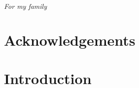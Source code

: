 \documentclass[12pt,]{book}
\theoremstyle{definition}
\theoremstyle{definition}
\theoremstyle{definition}
\theoremstyle{remark}
\renewcommand{\cleardoublepage}{\pagebreak}
\renewcommand{\clearpage}{\pagebreak}
\begin{document}
\pagebreak
\hspace{0pt}
\vfill
\begin{center}
\textit{For my family}
\end{center}
\vfill\hspace{0pt}
\pagebreak


\begingroup
\renewcommand{\cleardoublepage}{}
\renewcommand{\clearpage}{}
\chapter*{Acknowledgements}
\endgroup



\singlespacing

{
\setcounter{tocdepth}{1}
\tableofcontents
}

\doublespacing

\mainmatter

\hypertarget{intro}{%
\chapter{Introduction}\label{intro}}
\end{document}
